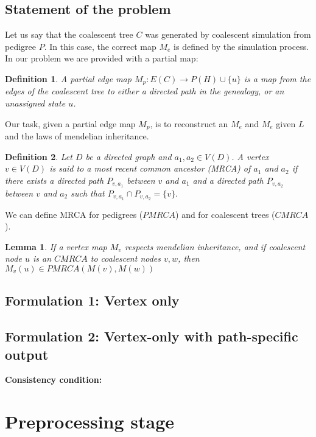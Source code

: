 \documentclass[14pt]{extarticle}
\newtheorem{definition}{Definition}
\newtheorem{lemma}{Lemma}
\begin{document}
\subsection{Statement of the problem} 

Let us say that the coalescent tree $C$ was generated by coalescent simulation from pedigree $P$. In this case, the correct map $M_e$ is defined by the simulation process. 
In our problem we are provided with a partial map: 

\begin{definition}
A partial edge map $M_p:E(C) \rightarrow P(H) \cup \{u\}$ is a map from the edges of the coalescent tree to either a directed path in the genealogy, or an unassigned state $u$.    
\end{definition}



Our task, given a partial edge map $M_p$, is to reconstruct an $M_e$ and $M_e$ given $L$ and the laws of mendelian inheritance.  
\begin{definition}
	Let $D$ be a directed graph and $a_1, a_2 \in V(D)$. A vertex $v \in V(D)$ is said to a most recent common ancestor (MRCA) of $a_1$ and $a_2$ if there exists 
	a directed path $P_{v,a_1}$ between $v$ and $a_1$ and a directed path $P_{v,a_2}$ between $v$ and $a_2$ such that $P_{v,a_1} \cap P_{v,a_2} = \{v\}.$	
\end{definition}

We can define MRCA for pedigrees ($PMRCA$) and for coalescent trees ($CMRCA$).


\begin{lemma}
If a vertex map $M_v$ respects mendelian inheritance, and if coalescent node $u$ is an $CMRCA$ to coalescent nodes $v, w$, then $M_v(u) \in PMRCA(M(v),M(w))$   
\end{lemma}



 

\subsection{Formulation 1: Vertex only} 

\subsection{Formulation 2: Vertex-only with path-specific output}

\textbf{Consistency condition:} 

\section{Preprocessing stage}
\end{document}
